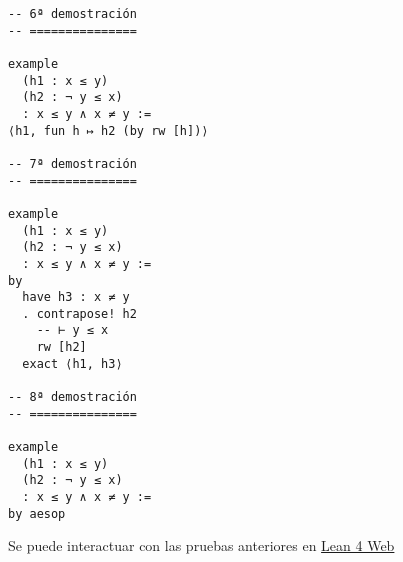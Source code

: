\begin{verbatim}
-- 6ª demostración
-- ===============

example
  (h1 : x ≤ y)
  (h2 : ¬ y ≤ x)
  : x ≤ y ∧ x ≠ y :=
⟨h1, fun h ↦ h2 (by rw [h])⟩

-- 7ª demostración
-- ===============

example
  (h1 : x ≤ y)
  (h2 : ¬ y ≤ x)
  : x ≤ y ∧ x ≠ y :=
by
  have h3 : x ≠ y
  . contrapose! h2
    -- ⊢ y ≤ x
    rw [h2]
  exact ⟨h1, h3⟩

-- 8ª demostración
-- ===============

example
  (h1 : x ≤ y)
  (h2 : ¬ y ≤ x)
  : x ≤ y ∧ x ≠ y :=
by aesop
\end{verbatim}
Se puede interactuar con las pruebas anteriores en \href{https://lean.math.hhu.de/\#url=https://raw.githubusercontent.com/jaalonso/Calculemus2/main/src/Introduccion\_de\_la\_conjuncion.lean}{Lean 4 Web}

